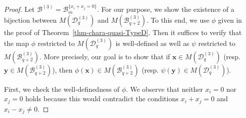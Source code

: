 \documentclass{article}
\theoremstyle{plain}
\theoremstyle{definition}
\theoremstyle{remark}
\numberwithin{equation}{section}
\newcommand{\Bc}{\mathcal{B}}
\newcommand{\Dc}{\mathcal{D}}
\newcommand{\RR}{\mathbb{R}}
\begin{document}
\begin{proof}
Let $\Bc^{(3)} = \Bc_m^{\{x_i+x_j=0\}}$.
For our purpose, we show the existence of a bijection between $M(\Dc^{(3)}_q)$ and $M(\Bc^{(3)}_{q+2})$. %
To this end, we use $\phi$ given in the proof of Theorem~\ref{thm-chara-quasi-TypeD}. 
Then it suffices to verify that the map $\phi$ restricted to $M(\Dc^{(3)}_q)$ is well-defined as well as $\psi$ restricted to $M(\Bc^{(3)}_{q+2})$. 
More precisely, our goal is to show that if $\bm{x} \in M(\Dc^{(3)}_q)$ (resp. $\bm{y} \in M(\Bc^{(3)}_{q+2})$), 
then $\phi(\bm{x}) \in M(\Bc^{(3)}_{q+2})$ (resp. $\psi(\bm{y}) \in M(\Dc^{(3)}_q)$). 

First, we check the well-definedness of $\phi$. 
We observe that neither $x_i = 0$ nor $x_j = 0$ holds because this would contradict the conditions $x_i+x_j=0$ and $x_i - x_j \neq 0$. 


\end{proof}
\end{document}

